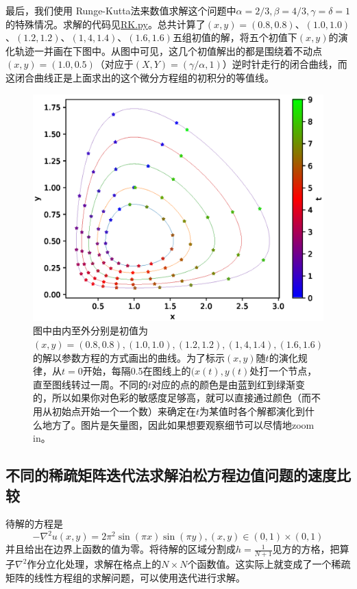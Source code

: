 \documentclass[UTF8,size=9.5]{ctexart}
\begin{document}
最后，我们使用 Runge-Kutta法来数值求解这个问题中$\alpha=2/3,\beta=4/3,\gamma=\delta=1$的特殊情况。求解的代码见\href{./RK.py}{RK.py}。总共计算了$(x,y)=(0.8,0.8)$、$(1.0,1.0)$、$(1.2,1.2)$、$(1,4,1.4)$、$(1.6,1.6)$五组初值的解，将五个初值下$(x,y)$的演化轨迹一并画在下图中。从图中可见，这几个初值解出的都是围绕着不动点$(x,y)=(1.0,0.5)$（对应于$(X,Y)=(\gamma/\alpha,1)$）逆时针走行的闭合曲线，而这闭合曲线正是上面求出的这个微分方程组的初积分的等值线。

\begin{figure}
  \centering
  \includegraphics[width=\linewidth]{RK.eps}
  \caption{图中由内至外分别是初值为$(x,y)= (0.8,0.8),(1.0,1.0),(1.2,1.2),(1,4,1.4),(1.6,1.6)$的解以参数方程的方式画出的曲线。为了标示$(x,y)$随$t$的演化规律，从$t=0$开始，每隔0.5在图线上的$(x(t),y(t)$处打一个节点，直至图线转过一周。不同的$t$对应的点的颜色是由蓝到红到绿渐变的，所以如果你对色彩的敏感度足够高，就可以直接通过颜色（而不用从初始点开始一个一个数）来确定在$t$为某值时各个解都演化到什么地方了。图片是矢量图，因此如果想要观察细节可以尽情地zoom in。}
\end{figure}

\subsection{不同的稀疏矩阵迭代法求解泊松方程边值问题的速度比较}
待解的方程是
\[-\nabla^2u(x,y)=2\pi^2\sin(\pi x)\sin(\pi y),(x,y)\in(0,1)\times(0,1)\]
并且给出在边界上函数的值为零。将待解的区域分割成$h=\frac{1}{N+1}$见方的方格，把算子$\nabla^2$作分立化处理，求解在格点上的$N\times N$个函数值。这实际上就变成了一个稀疏矩阵的线性方程组的求解问题，可以使用迭代进行求解。
\end{document}
